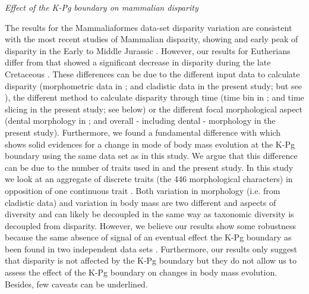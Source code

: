 \documentclass[12pt,letterpaper]{article}
\renewcommand{\subsection}[1]{%
\bigskip
\begin{center}
\begin{large}
\normalfont\itshape #1
\end{large}
\end{center}}
\begin{document}
\subsection{Effect of the K-Pg boundary on mammalian disparity}
The results for the Mammaliaformes data-set disparity variation are consistent with the most recent studies of Mammalian disparity, showing and early peak of disparity in the Early to Middle Jurassic \citep{Close2015}.
However, our results for Eutherians differ from \cite{Grossnickle2013} that showed a significant decrease in disparity during the late Cretaceous \citep[but see][]{Wilson2012}.
These differences can be due to the different input data to calculate disparity (morphometric data in \citealt{Grossnickle2013}; and cladistic data in the present study; but see \citealt{hetherington2015cladistic}), the different method to calculate disparity through time (time bin in \citealt{Grossnickle2013}; and time slicing in the present study; see below) or the different focal morphological aspect (dental morphology in \citealt{Grossnickle2013}; and overall - including dental - morphology in the present study).
Furthermore, we found a fundamental difference with \cite{Slater2012MEE} which shows solid evidences for a change in mode of body mass evolution at the K-Pg boundary using the same data set as in this study.
We argue that this difference can be due to the number of traits used in \cite{Slater2012MEE} and the present study.
In this study we look at an aggregate of discrete traits (the 446 morphological characters) in opposition of one continuous trait \citep[body mass in][]{Slater2012MEE}.
Both variation in morphology (i.e. from cladistic data) and variation in body mass are two different and aspects of diversity and can likely be decoupled in the same way as taxonomic diversity is decoupled from disparity. 
However, we believe our results show some robustness because the same absence of signal of an eventual effect the K-Pg boundary as been found in two independent data sets \citep[i.e.][]{Slater2012MEE,beckancient2014}.
Furthermore, our results only suggest that disparity is not affected by the K-Pg boundary but they do not allow us to assess the effect of the K-Pg boundary on changes in body mass evolution. %
Besides, few caveats can be underlined.  %
\end{document}
